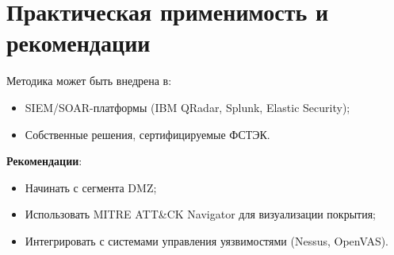\section{Практическая применимость и рекомендации}

Методика может быть внедрена в:
\begin{itemize}
    \item SIEM/SOAR-платформы (IBM QRadar, Splunk, Elastic Security);
    \item Собственные решения, сертифицируемые ФСТЭК.
\end{itemize}

\textbf{Рекомендации}:
\begin{itemize}
    \item Начинать с сегмента DMZ;
    \item Использовать MITRE ATT\&CK Navigator для визуализации покрытия;
    \item Интегрировать с системами управления уязвимостями (Nessus, OpenVAS).
\end{itemize}